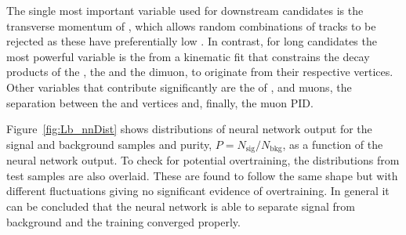 The single most important variable used for downstream candidates is the transverse momentum of
\Lz, which allows random combinations of tracks to be rejected as these have preferentially low \pt.
In contrast, for long candidates the most powerful variable is the \chisq from a kinematic fit that constrains
the decay products of the \Lb, the \Lz and the dimuon, to originate from their respective vertices. 
Other variables that contribute significantly are the \chisqip of \Lb, \Lz and muons,
the separation between the \Lb and \Lz vertices and, finally, the muon PID.

Figure~\ref{fig:Lb_nnDist} shows distributions of neural network output for the signal and background samples
and purity, $P=N_{\mathrm{sig}}/N_{\mathrm{bkg}}$, as a function of the neural network output.
To check for potential overtraining, the distributions from test samples are also overlaid. These are found to 
follow the same shape but with different fluctuations
giving no significant evidence of overtraining. In general it can be concluded that the neural network
is able to separate signal from background and the training converged properly.
%

